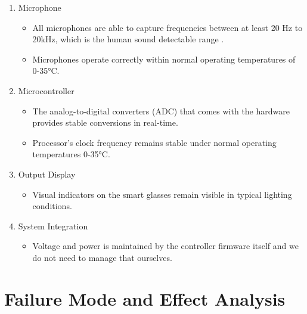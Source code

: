 \documentclass{article}
\begin{document}
\begin{enumerate}
    \item Microphone
    \begin{itemize}
        \item All microphones are able to capture frequencies between at least
        20 Hz to 20kHz, which is the human sound detectable range
        \cite{Neuroscience2001}.
        \item Microphones operate correctly within normal operating temperatures
        of 0-35°C. 
    \end{itemize}
    
    \item Microcontroller
    \begin{itemize}
        \item The analog-to-digital converters (ADC) that comes with the
        hardware provides stable conversions in real-time.
        \item Processor's clock frequency remains stable under normal
        operating temperatures 0-35°C.
    \end{itemize}

    \item Output Display
    \begin{itemize}
        \item Visual indicators on the smart glasses remain visible in typical
        lighting conditions. 
    \end{itemize}

    \item System Integration
    \begin{itemize}
        \item Voltage and power is maintained by the controller firmware itself
        and we do not need to manage that ourselves. 
    \end{itemize}
    
\end{enumerate}

\section{Failure Mode and Effect Analysis}
\end{document}
